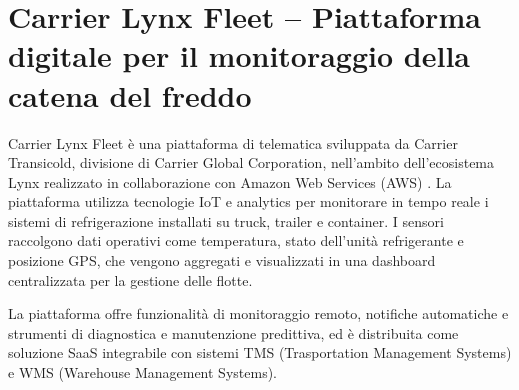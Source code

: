 



\section{Carrier Lynx Fleet -- Piattaforma digitale per il monitoraggio della catena del freddo}

Carrier Lynx Fleet è una piattaforma di telematica sviluppata da Carrier Transicold, divisione di Carrier Global Corporation, nell'ambito dell'ecosistema Lynx realizzato in collaborazione con Amazon Web Services (AWS) \cite{carrierlynx2024}. La piattaforma utilizza tecnologie IoT e analytics per monitorare in tempo reale i sistemi di refrigerazione installati su truck, trailer e container. I sensori raccolgono dati operativi come temperatura, stato dell'unità refrigerante e posizione GPS, che vengono aggregati e visualizzati in una dashboard centralizzata per la gestione delle flotte.

La piattaforma offre funzionalità di monitoraggio remoto, notifiche automatiche e strumenti di diagnostica e manutenzione predittiva, ed è distribuita come soluzione SaaS integrabile con sistemi TMS (Trasportation Management Systems) e WMS (Warehouse Management Systems).

